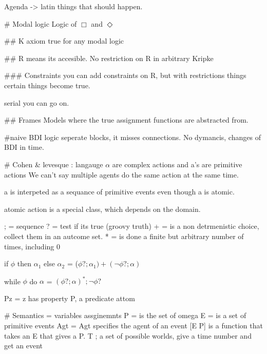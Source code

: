 Agenda -> latin things that should happen.

# Modal logic
Logic of $\Box$ and $\Diamond$

## K axiom
true for any modal logic

## R
means its accesible. No restriction on R in arbitrary Kripke


### Constraints
you can add constraints on R, but with restrictions things certain
things become true.

serial you can go on.

## Frames
Models where the true assignment functions are abstracted from.

#naive BDI logic
seperate blocks, it misses connections.
No dymancis, changes of BDI in time.

# Cohen & levesque : langauge
$\alpha$ are complex actions and a's are primitive actions
We can't say multiple agents do the same action at the same time.

a is interpeted as a sequance of primitive events even though a is
atomic.

atomic action is a special class, which depends on the domain.

; = sequence
? = test if its true (groovy truth)
+ = is a non detrmenistic choice, collect them in an autcome set.
* = is done a finite but arbitrary number of times, including 0

if $\phi$ then $\alpha_1$ else
$\alpha_2$ = ($\phi? ; \alpha_1) + (\neg \phi?;\alpha)$

while $\phi$ do $\alpha$ = $(\phi?;\alpha)^*;\neg\phi?$

Pz = z has property P, a predicate attom


# Semantics
\omega = variables assginemnts
P = is the set of omega \in \omega
E = is a set of primitive events
Agt = Agt \in [E \to p] specifies the agent of an event [E \to P] is a
function that takes an E that gives a P.
T \subset [Z \to E]; a set of possible worlds, give a time number and get
an event


